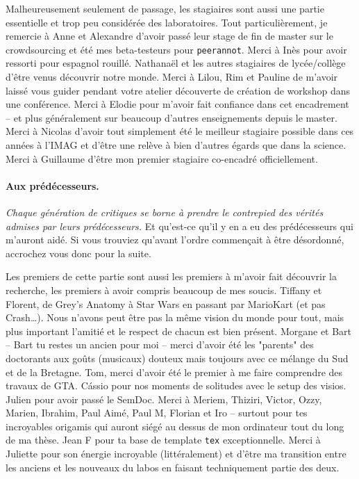 Malheureusement seulement de passage, les stagiaires sont aussi une partie essentielle et trop peu considérée des laboratoires.
Tout particulièrement, je remercie à Anne et Alexandre d'avoir passé leur stage de fin de master sur le crowdsourcing et été mes beta-testeurs pour \texttt{peerannot}.
Merci à Inès pour avoir ressorti pour espagnol rouillé.
Nathanaël et les autres stagiaires de lycée/collège d'être venus découvrir notre monde.
Merci à Lilou, Rim et Pauline de m'avoir laissé vous guider pendant votre atelier découverte de création de workshop dans une conférence.
Merci à Elodie pour m'avoir fait confiance dans cet encadrement -- et plus généralement sur beaucoup d'autres enseignements depuis le master.
Merci à Nicolas d'avoir tout simplement été le meilleur stagiaire possible dans ces années à l'IMAG et d'être une relève à bien d'autres égards que dans la science.
Merci à Guillaume d'être mon premier stagiaire co-encadré officiellement.

\medskip

\paragraph*{Aux prédécesseurs.}
\emph{Chaque génération de critiques se borne à prendre le contrepied des vérités admises par leurs prédécesseurs.} Et qu'est-ce qu'il y en a eu des prédécesseurs qui m'auront aidé. Si vous trouviez qu'avant l'ordre commençait à être désordonné, accrochez vous donc pour la suite.

Les premiers de cette partie sont aussi les premiers à m'avoir fait découvrir la recherche, les premiers à avoir compris beaucoup de mes soucis.
Tiffany et Florent, de Grey's Anatomy à Star Wars en passant par MarioKart (et pas Crash\dots). Nous n'avons peut être pas la même vision du monde pour tout, mais plus important l'amitié et le respect de chacun est bien présent.
Morgane et Bart -- Bart tu restes un ancien pour moi -- merci d'avoir été les "parents" des doctorants aux goûts (musicaux) douteux mais toujours avec ce mélange du Sud et de la Bretagne.
Tom, merci d'avoir été le premier à me faire comprendre des travaux de GTA.
C\'{a}ssio pour nos moments de solitudes avec le setup des visios.
Julien pour avoir passé le SemDoc.
Merci à Meriem, Thiziri, Victor, Ozzy, Marien, Ibrahim, Paul Aimé, Paul M,  Florian et Iro -- surtout pour tes incroyables origamis qui auront siégé au dessus de mon ordinateur tout du long de ma thèse.
Jean F pour ta base de template \texttt{tex} exceptionnelle.
Merci à Juliette pour son énergie incroyable (littéralement) et d'être ma transition entre les anciens et les nouveaux du labos en faisant techniquement partie des deux.

